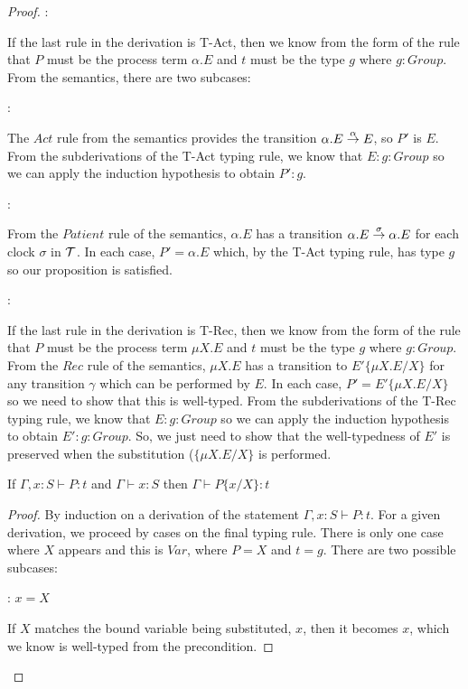\begin{proof}
:

\noindent If the last rule in the derivation is T-Act, then we know
from the form of the rule that $P$ must be the process term
$\alpha.E$ and $t$ must be the type $g$ where $g : Group$.  From
the semantics, there are two subcases:

:

\noindent The $Act$ rule from the semantics provides the transition
$\alpha.E \stackrel{\alpha}{\rightarrow} E$, so $P'$ is $E$.  From the
subderivations of the T-Act typing rule, we know that $E : g :
Group$ so we can apply the induction hypothesis to obtain $P' : g$.

:

\noindent From the $Patient$ rule of the semantics, $\alpha.E$ has a transition
$\alpha.E \stackrel{\sigma}{\rightarrow} \alpha.E$ for each clock $\sigma$ in
$\text{$\mathcal{T}$}$.  In each case, $P' = \alpha.E$ which, by the T-Act typing
rule, has type $g$ so our proposition is satisfied.

:

\noindent If the last rule in the derivation is T-Rec, then we know
from the form of the rule that $P$ must be the process term $\mu X.E$
and $t$ must be the type $g$ where $g : Group$.  From the $Rec$ rule
of the semantics, $\mu X.E$ has a transition to $E'\{\mu X.E/X\}$ for
any transition $\gamma$ which can be performed by $E$.  In each case,
$P' = E'\{\mu X.E/X\}$ so we need to show that this is well-typed.
From the subderivations of the T-Rec typing rule, we know that $E :
g : Group$ so we can apply the induction hypothesis to obtain $E' : g
: Group$.  So, we just need to show that the well-typedness of $E'$ is
preserved when the substitution ($\{\mu X.E/X\}$ is performed.

\begin{lemma}
If $\Gamma, x : S \vdash P : t$ and $\Gamma \vdash x : S$ then $\Gamma \vdash P\{x/X\} : t$
\end{lemma}

\begin{proof}
By induction on a derivation of the statement $\Gamma, x : S \vdash P
: t$.  For a given derivation, we proceed by cases on the final typing
rule.  There is only one case where $X$ appears and this is $Var$,
where $P = X$ and $t = g$.  There are two possible subcases:

: $x = X$

\noindent If $X$ matches the bound variable being substituted, $x$, then it
becomes $x$, which we know is well-typed from the precondition.
  

\end{proof}
\end{proof}
